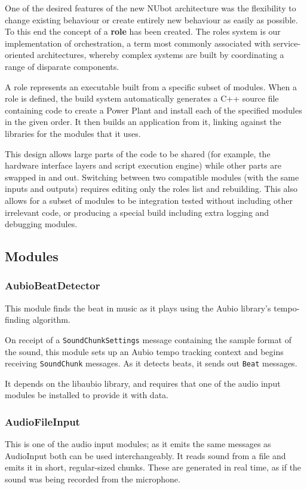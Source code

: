 \documentclass[english,12pt]{scrartcl}
\begin{document}
			One of the desired features of the new NUbot architecture was the flexibility to
			change existing behaviour or create entirely new behaviour as easily as possible. To
			this end the concept of a \textbf{role} has been created. The roles system is our
			implementation of orchestration, a term most commonly associated with service-oriented
			architectures, whereby complex systems are built by coordinating a range of disparate
			components.

			A role represents an executable built from a specific subset of modules. When a role
			is defined, the build system automatically generates a C++ source file containing code
			to create a Power Plant and install each of the specified modules in the given order.
			It then builds an application from it, linking against the libraries for the modules
			that it uses.

			This design allows large parts of the code to be shared (for example, the hardware
			interface layers and script execution engine) while other parts are swapped in and
			out. Switching between two compatible modules (with the same inputs and outputs)
			requires editing only the roles list and rebuilding. This also allows for a subset of
			modules to be integration tested without including other irrelevant code, or
			producing a special build including extra logging and debugging modules.


		\subsection{Modules}

			\subsubsection{AubioBeatDetector}
				This module finds the beat in music as it plays using the Aubio library's
				tempo-finding algorithm.

				On receipt of a \texttt{SoundChunkSettings} message containing the sample format
				of the sound, this module sets up an Aubio tempo tracking context and begins
				receiving \texttt{SoundChunk} messages. As it detects beats, it sends out
				\texttt{Beat} messages.

				It depends on the libaubio library, and requires that one of the audio input
				modules be installed to provide it with data.


			\subsubsection{AudioFileInput}
				This is one of the audio input modules; as it emits the same messages as
				AudioInput both can be used interchangeably. It reads sound from a file and emits
				it in short, regular-sized chunks. These are generated in real time, as if the
				sound was being recorded from the microphone.
\end{document}
